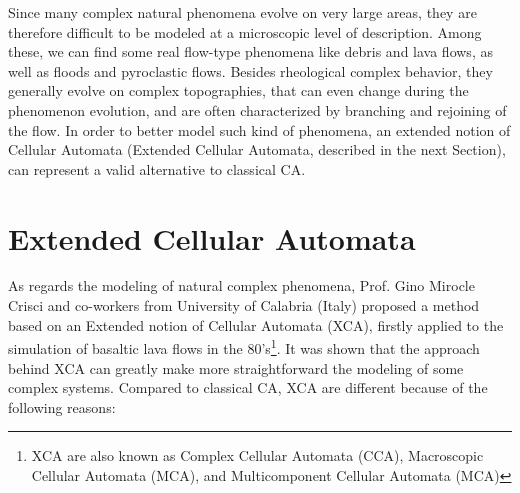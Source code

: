 Since many complex natural phenomena evolve on very large areas, they
are therefore difficult to be modeled at a microscopic level of
description. Among these, we can find some real flow-type phenomena
like debris and lava flows, as well as floods and pyroclastic
flows. Besides rheological complex behavior, they generally evolve on
complex topographies, that can even change during the phenomenon
evolution, and are often characterized by branching and rejoining of
the flow. In order to better model such kind of phenomena, an extended
notion of Cellular Automata (Extended Cellular Automata, described in
the next Section), can represent a valid alternative to classical CA.

\section{Extended Cellular Automata}

As regards the modeling of natural complex phenomena, Prof. Gino
Mirocle Crisci and co-workers from University of Calabria (Italy)
proposed a method based on an Extended notion of Cellular Automata
(XCA), firstly applied to the simulation of basaltic lava flows in the
80's\footnote{XCA are also known as Complex Cellular Automata (CCA),
  Macroscopic Cellular Automata (MCA), and Multicomponent Cellular
  Automata (MCA)}. It was shown that the approach behind XCA can
greatly make more straightforward the modeling of some complex
systems. Compared to classical CA, XCA are different because of the
following reasons:

